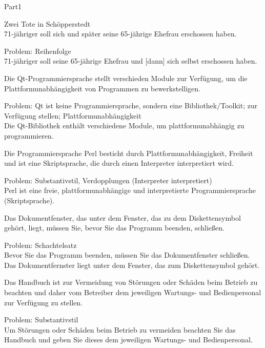 \documentclass[a4paper,twoside]{article}
\begin{document}
\begin{exam}[Teil I.]{Part1}
\begin{problem}[3]
Zwei Tote in Schöpperstedt\\
71-jähriger soll sich und später seine 65-jährige Ehefrau erschossen haben.
\begin{solution}%
Problem: Reihenfolge\\
71-jähriger soll seine 65-jährige Ehefrau und [dann] sich selbst erschossen haben.
\end{solution}
\end{problem}

\begin{problem}[3]
Die Qt-Programmiersprache stellt verschieden Module zur Verfügung, um
die Plattformunabhängigkeit von Programmen zu bewerkstelligen.
\begin{solution}%
Problem: Qt ist keine Programmiersprache, sondern eine Bibliothek/Toolkit; 
zur Verfügung stellen; Plattformunabhängigkeit\\
Die Qt-Bibliothek enthält verschiedene Module, um plattformunabhängig zu programmieren.
\end{solution}
\end{problem}

\begin{problem}[3]
Die Programmiersprache Perl besticht durch Plattformunabhängigkeit, Freiheit und ist eine 
Skriptsprache, die durch einen Interpreter interpretiert wird.
\begin{solution}%
Problem: Substantivstil, Verdopplungen (Interpreter interpretiert)\\
Perl ist eine freie, plattformunabhängige und interpretierte 
Programmiersprache (Skriptsprache).
\end{solution}
\end{problem}

\begin{problem}[3]
Das Dokumentfenster, das unter dem Fenster, das zu dem Diskettensymbol gehört, 
liegt, müssen Sie, bevor Sie das Programm beenden, schließen.
\begin{solution}
Problem: Schachtelsatz\\
Bevor Sie das Programm beenden, müssen Sie das Dokumentfenster schließen.
Das Dokumentfernster liegt unter dem Fenster, das zum Diskettensymbol gehört.
\end{solution}
\end{problem}



\begin{problem}[3]
Das Handbuch ist zur Vermeidung von Störungen oder Schäden beim Betrieb
zu beachten und daher vom Betreiber dem jeweiligen Wartungs- und Bedienpersonal
zur Verfügung zu stellen.
\begin{solution}
Problem: Substantivstil\\
Um Störungen oder Schäden beim Betrieb zu vermeiden beachten Sie das Handbuch
und geben Sie dieses dem jeweiligen Wartungs- und Bedienpersonal.
\end{solution}
\end{problem}


\end{exam}
\end{document}
